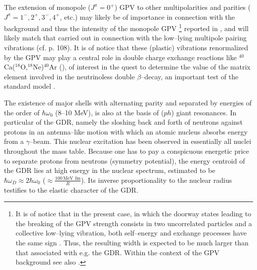 \documentclass[a4paper,11pt]{article}
\numberwithin{equation}{section}
\numberwithin{figure}{section}
\numberwithin{table}{section}
\begin{document}
The extension of monopole ($J^\pi=0^+$) GPV to other multipolarities and parities ($J^\pi=1^-,2^+,3^-,4^+$, etc.) may likely be of importance in connection with the background and thus the intensity of the monopole GPV \footnote{It is of notice that in the present case, in which the doorway states leading to the breaking of the GPV strength consists in two uncorrelated particles and a collective low--lying vibration, both self--energy and exchange processes have the same sign \cite{Bortignon:83}. Thus, the resulting width is expected to be much larger than that associated with e.g. the GDR. Within the context of the GPV background see also \cite{Bortignon:86}.} reported in \cite{Cappuzzello:15}, and will likely match that carried out in connection with the low--lying multipole pairing vibrations (cf. \cite{Brink:05} p. 108). It is of notice that these (plastic) vibrations renormalized by the GPV may play a central role in double charge exchange reactions like $^{40}$Ca($^{18}$O,$^{18}$Ne)$^{40}$Ar (\cite{Cappuzzello:15b}), of interest in the quest to determine the value of the matrix element involved in the neutrinoless double $\beta$--decay, an important test of the standard model \cite{Suhonen:98,Frekers:13,Rodin:09,Guess:11}.


The existence of major shells with alternating parity and separated by energies of the order of $\hbar\omega_0$ (8--10 MeV), is also at the basis of ($ph$) giant resonances. In particular of the GDR, namely the sloshing back and forth of neutrons against protons in an antenna--like motion with which an atomic nucleus absorbs energy from a $\gamma$--beam. This nuclear excitation has been observed in essentially all nuclei throughout the mass table. Because one has to pay a conspicuous energetic price to separate protons from neutrons (symmetry potential), the energy centroid of the GDR lies at high energy in the nuclear spectrum, estimated to be $\hbar\omega_D\approx 2\hbar\omega_0$ ($\approx\frac{100\,\text{MeV fm}}{R}$). Its inverse proportionality to the nuclear radius  testifies to the elastic character of the GDR.
\end{document}
